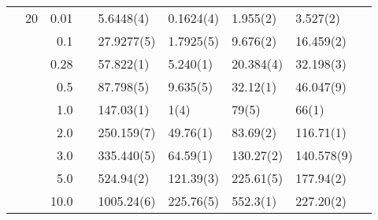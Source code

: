 \begin{table}[H]
\begin{tabularx}{\textwidth}{R{1cm}rrcR{2.3cm}R{2.3cm}R{2.3cm}R{2.3cm}R{1cm}}
		&20 & 0.01 && 5.6448(4) & 0.1624(4) & 1.955(2) & 3.527(2) \\
		&& 0.1 && 27.9277(5) & 1.7925(5) & 9.676(2) & 16.459(2) \\
		&& 0.28 && 57.822(1) & 5.240(1) & 20.384(4) & 32.198(3) \\
		&& 0.5 && 87.798(5) & 9.635(5) & 32.12(1) & 46.047(9) \\
		&& 1.0 && 147.03(1) & 1(4) & 79(5) & 66(1) \\
		&& 2.0 && 250.159(7) & 49.76(1) & 83.69(2) & 116.71(1) \\
		&& 3.0 && 335.440(5) & 64.59(1) & 130.27(2) & 140.578(9) \\ 
		&& 5.0 && 524.94(2) & 121.39(3) & 225.61(5) & 177.94(2) \\
		&& 10.0 && 1005.24(6) & 225.76(5) & 552.3(1) & 227.20(2) \\
		\hline \hline
	\end{tabularx}
\end{table}

